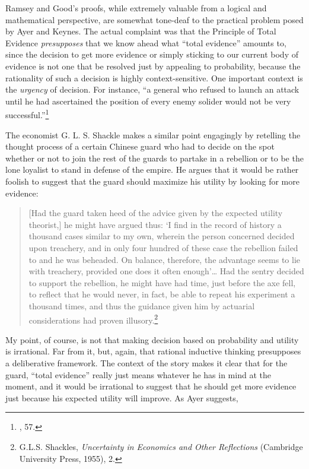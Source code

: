 Ramsey and Good's proofs, while extremely valuable from a logical and
mathematical perspective, are somewhat tone-deaf to the practical problem
posed by Ayer and Keynes. The actual complaint was that the Principle of
Total Evidence \emph{presupposes} that we know ahead what ``total
evidence'' amounts to, since the decision to get more evidence or simply
sticking to our current body of evidence is not one that be resolved
just by appealing to probability, because the rationality of such a
decision is highly context-sensitive. One important context is the
\emph{urgency} of decision. For instance, ``a general who refused to
launch an attack until he had ascertained the position of every enemy
solider would not be very successful.''\footnote{\cite{ayerpae}, 57.}

The economist G. L. S. Shackle makes a similar point engagingly by
retelling the thought process of a certain Chinese guard who had to
decide on the spot whether or not to join the rest of the guards to
partake in a rebellion or to be the lone loyalist to stand in defense of
the empire. He argues that it would be rather foolish to suggest that
the guard should maximize his utility by looking for more evidence:

\begin{quote}
{[}Had the guard taken heed of the advice given by the expected utility
theorist,{]} he might have argued thus: `I find in the record of history
a thousand cases similar to my own, wherein the person concerned decided
upon treachery, and in only four hundred of these case the rebellion
failed to and he was beheaded. On balance, therefore, the advantage
seems to lie with treachery, provided one does it often enough'\ldots{}
Had the sentry decided to support the rebellion, he might have had time,
just before the axe fell, to reflect that he would never, in fact, be
able to repeat his experiment a thousand times, and thus the guidance
given him by actuarial considerations had proven illusory.\footnote{G.L.S.
  Shackles, \emph{Uncertainty in Economics and Other Reflections}
  (Cambridge University Press, 1955), 2.}
\end{quote}

My point, of course, is not that making decision based on probability
and utility is irrational. Far from it, but, again, that rational
inductive thinking presupposes a deliberative framework. The context of
the story makes it clear that for the guard, ``total evidence'' really
just means whatever he has in mind at the moment, and it would be
irrational to suggest that he should get more evidence just because his
expected utility will improve. As Ayer suggests, 

